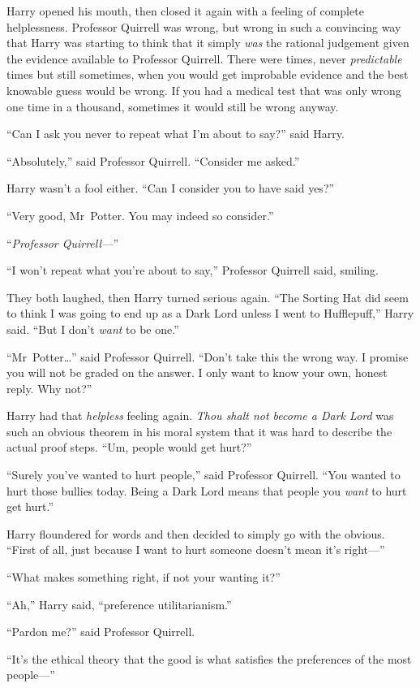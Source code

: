 Harry opened his mouth, then closed it again with a feeling of complete helplessness. Professor Quirrell was wrong, but wrong in such a convincing way that Harry was starting to think that it simply \emph{was} the rational judgement given the evidence available to Professor Quirrell. There were times, never \emph{predictable} times but still sometimes, when you would get improbable evidence and the best knowable guess would be wrong. If you had a medical test that was only wrong one time in a thousand, sometimes it would still be wrong anyway.

“Can I ask you never to repeat what I’m about to say?” said Harry.

“Absolutely,” said Professor Quirrell.
“Consider me asked.”

Harry wasn’t a fool either.
“Can I consider you to have said yes?”

“Very good, Mr~Potter. You may indeed so consider.”

“\emph{Professor Quirrell—}”

“I won’t repeat what you’re about to say,” Professor Quirrell said, smiling.

They both laughed, then Harry turned serious again.
“The Sorting Hat did seem to think I was going to end up as a Dark Lord unless I went to Hufflepuff,” Harry said.
“But I don’t \emph{want} to be one.”

“Mr~Potter…” said Professor Quirrell.
“Don’t take this the wrong way. I promise you will not be graded on the answer. I only want to know your own, honest reply. Why not?”

Harry had that \emph{helpless} feeling again. \emph{Thou shalt not become a Dark Lord} was such an obvious theorem in his moral system that it was hard to describe the actual proof steps.
“Um, people would get hurt?”

“Surely you’ve wanted to hurt people,” said Professor Quirrell.
“You wanted to hurt those bullies today. Being a Dark Lord means that people you \emph{want} to hurt get hurt.”

Harry floundered for words and then decided to simply go with the obvious.
“First of all, just because I want to hurt someone doesn’t mean it’s right—”

“What makes something right, if not your wanting it?”

“Ah,” Harry said, “preference utilitarianism.”

“Pardon me?” said Professor Quirrell.

“It’s the ethical theory that the good is what satisfies the preferences of the most people—”


